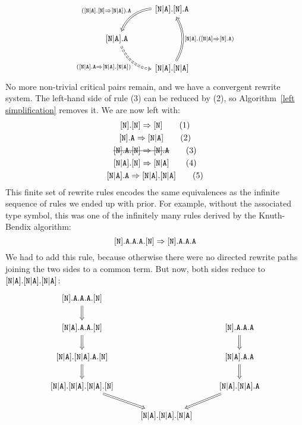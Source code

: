 \documentclass[../generics]{subfiles}
\begin{document}
\[
\begin{tikzcd}[ampersand replacement=\&]%
\&\assocsym{N}{A}.\protosym{N}.\texttt{A}\arrow[ld, Rightarrow, "(\ProtoConf{\assocsym{N}{A}}{N}).\texttt{A}"', bend right]\\
\assocsym{N}{A}.\texttt{A}\arrow[rd, Rightarrow, "(\assocsym{N}{A}.\texttt{A}\Rightarrow\assocsym{N}{A}.\assocsym{N}{A})"', bend right, dashed]\&\\
\&\assocsym{N}{A}.\assocsym{N}{A}\arrow[uu, Rightarrow, "\assocsym{N}{A}.(\AssocIntroInv{N}{A})"', bend right]
\end{tikzcd}
\]
No more non-trivial critical pairs remain, and we have a convergent rewrite system. The left-hand side of rule (3) can be reduced by (2), so Algorithm~\ref{left simplification} removes it. We are now left with:
\begin{gather*}
\protosym{N}.\protosym{N}\Rightarrow\protosym{N}\tag{1}\\
\protosym{N}.\texttt{A}\Rightarrow\assocsym{N}{A}\tag{2}\\
\text{\sout{$\protosym{N}.\texttt{A}.\protosym{N}\Rightarrow\protosym{N}.\texttt{A}$}}\tag{3}\\
\assocsym{N}{A}.\protosym{N}\Rightarrow\assocsym{N}{A}\tag{4}\\
\assocsym{N}{A}.\texttt{A}\Rightarrow\assocsym{N}{A}.\assocsym{N}{A}\tag{5}
\end{gather*}
This finite set of rewrite rules encodes the same equivalences as the infinite sequence of rules we ended up with prior. For example, without the associated type symbol, this was one of the infinitely many rules derived by the Knuth-Bendix algorithm:
\[[\texttt{N}].\texttt{A}.\texttt{A}.\texttt{A}.[\texttt{N}]\Rightarrow[\texttt{N}].\texttt{A}.\texttt{A}.\texttt{A}\]
We had to add this rule, because otherwise there were no directed rewrite paths joining the two sides to a common term. But now, both sides reduce to $[\texttt{N}|\texttt{A}].[\texttt{N}|\texttt{A}].[\texttt{N}|\texttt{A}]$:
\[
\begin{tikzcd}
\protosym{N}.\texttt{A}.\texttt{A}.\texttt{A}.\protosym{N}
\arrow[d, Rightarrow]\\
\assocsym{N}{A}.\texttt{A}.\texttt{A}.\protosym{N}
\arrow[d, Rightarrow]&&
\protosym{N}.\texttt{A}.\texttt{A}.\texttt{A}
\arrow[d, Rightarrow]\\
\assocsym{N}{A}.\assocsym{N}{A}.\texttt{A}.\protosym{N}
\arrow[d, Rightarrow]&&
\assocsym{N}{A}.\texttt{A}.\texttt{A}
\arrow[d, Rightarrow]\\
\assocsym{N}{A}.\assocsym{N}{A}.\assocsym{N}{A}.\protosym{N}
\arrow[rd, Rightarrow]&&
\assocsym{N}{A}.\assocsym{N}{A}.\texttt{A}
\arrow[ld, Rightarrow]\\
&\assocsym{N}{A}.\assocsym{N}{A}.\assocsym{N}{A}
\end{tikzcd}
\]
\end{document}
